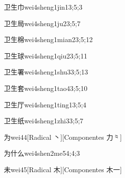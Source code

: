 \begin{verbete}{卫生巾}{wei4sheng1jin1}{3;5;3}
\end{verbete}

\begin{verbete}{卫生局}{wei4sheng1ju2}{3;5;7}
\end{verbete}

\begin{verbete}{卫生棉}{wei4sheng1mian2}{3;5;12}
\end{verbete}

\begin{verbete}{卫生球}{wei4sheng1qiu2}{3;5;11}
\end{verbete}

\begin{verbete}{卫生署}{wei4sheng1shu3}{3;5;13}
\end{verbete}

\begin{verbete}{卫生套}{wei4sheng1tao4}{3;5;10}
\end{verbete}

\begin{verbete}{卫生厅}{wei4sheng1ting1}{3;5;4}
\end{verbete}

\begin{verbete}{卫生纸}{wei4sheng1zhi3}{3;5;7}
\end{verbete}

\begin{verbete}{为}{wei4}{4}[Radical 丶][Componentes 力⺀]
\end{verbete}

\begin{verbete}{为什么}{wei4shen2me5}{4;4;3}
\end{verbete}

\begin{verbete}{未}{wei4}{5}[Radical 木][Componentes 木一]
\end{verbete}

